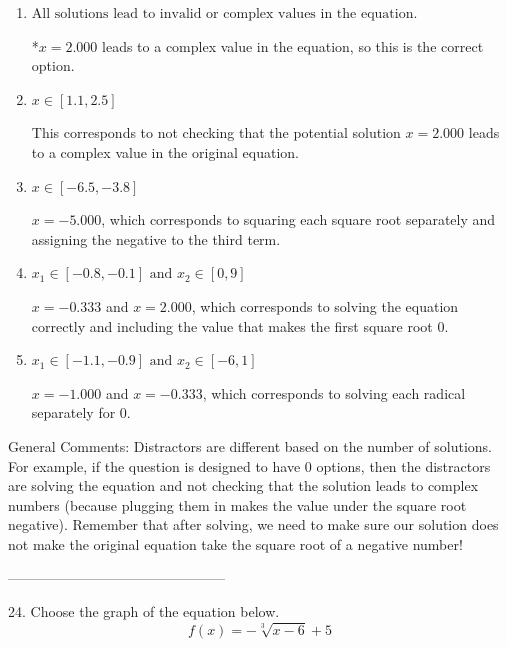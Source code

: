 \documentclass{article}[14pt]
\begin{document}
\begin{enumerate}[label=\Alph*.] 
\item $ \text{All solutions lead to invalid or complex values in the equation.} $ 

 *$x = 2.000$ leads to a complex value in the equation, so this is the correct option. 
\item $ x \in [1.1,2.5] $ 

 This corresponds to not checking that the potential solution $x = 2.000$ leads to a complex value in the original equation. 
\item $ x \in [-6.5,-3.8] $ 

 $x = -5.000$, which corresponds to squaring each square root separately and assigning the negative to the third term. 
\item $ x_1 \in [-0.8, -0.1] \text{ and } x_2 \in [0,9] $ 

 $x = -0.333$ and $x = 2.000$, which corresponds to solving the equation correctly and including the value that makes the first square root 0. 
\item $ x_1 \in [-1.1, -0.9] \text{ and } x_2 \in [-6,1] $ 

 $x = -1.000$ and $x = -0.333$, which corresponds to solving each radical separately for 0. 
\end{enumerate} 
 
General Comments: Distractors are different based on the number of solutions. For example, if the question is designed to have 0 options, then the distractors are solving the equation and not checking that the solution leads to complex numbers (because plugging them in makes the value under the square root negative). Remember that after solving, we need to make sure our solution does not make the original equation take the square root of a negative number!

-----------------------------------------------

24. Choose the graph of the equation below.
$$ f(x) = - \sqrt[3]{x - 6} + 5 $$ 
\end{document}
